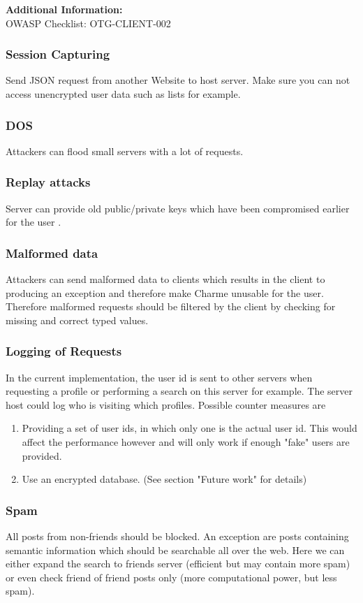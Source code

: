 \documentclass{scrartcl}
\begin{document}
        \textbf{Additional Information:}\\
   OWASP Checklist: OTG-CLIENT-002
   
   \subsubsection{Session Capturing}
Send JSON request from another Website to host server. Make sure you can not access unencrypted user data such as lists for example.

\subsubsection{DOS}
Attackers can flood small servers with a lot of requests.
       \subsubsection{Replay attacks}
          Server can provide old public/private keys which have been compromised earlier for the user .
      \subsubsection{Malformed data}
      Attackers can send malformed data to clients which results in the client to producing an exception and therefore make Charme unusable for the user. Therefore malformed requests should be filtered by the client by checking for missing and correct typed values.
      \subsubsection{Logging of Requests}
      In the current implementation, the user id is sent to other servers when requesting a profile or performing a search on this server for example. The server host could log who is visiting which profiles. 
Possible counter measures are 
\begin{enumerate}
\item Providing a set of user ids, in which only one is the actual user id. This would affect the performance however and will only work if enough "fake" users are provided.
\item Use an encrypted database. (See section "Future work" for details)
\end{enumerate}      
      
      \subsubsection{Spam}
      All posts from non-friends should be blocked. An exception are posts containing semantic information which should be searchable all over the web. Here we can either expand the search to friends server (efficient but may contain more spam) or even check friend of friend posts only (more computational power, but less spam).
\end{document}
